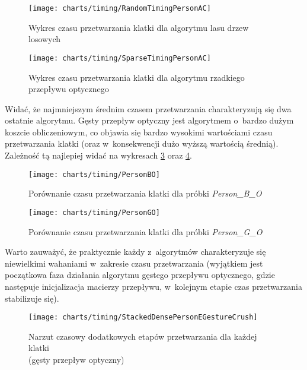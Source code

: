     \newpage
    \begin{figure}[!ht]
      \centering
      \texttt{[image: charts/timing/RandomTimingPersonAC]}
      \caption[Wykres czasu przetwarzania klatki dla algorytmu lasu drzew losowych]
              {Wykres czasu przetwarzania klatki dla algorytmu lasu drzew losowych}
      \label{fig:RandomTimingPersonAC}
    \end{figure}

    \begin{figure}[!ht]
      \centering
      \texttt{[image: charts/timing/SparseTimingPersonAC]}
      \caption[Wykres czasu przetwarzania klatki dla algorytmu rzadkiego przepływu optycznego]
              {Wykres czasu przetwarzania klatki dla algorytmu rzadkiego przepływu optycznego}
      \label{fig:SparseTimingPersonAC}
    \end{figure}

    Widać, że najmniejszym średnim czasem przetwarzania charakteryzują się dwa ostatnie algorytmu. Gęsty przepływ optyczny jest algorytmem o~bardzo dużym koszcie obliczeniowym, co objawia się bardzo wysokimi wartościami czasu przetwarzania klatki (oraz w~konsekwencji dużo wyższą wartością średnią). Zależność tą najlepiej widać na wykresach \ref{fig:PersonBO} oraz \ref{fig:PersonGO}.

    \begin{figure}[!ht]
      \centering
      \texttt{[image: charts/timing/PersonBO]}
      \caption[Porównanie czasu przetwarzania klatki dla próbki Person\_B\_O]
              {Porównanie czasu przetwarzania klatki dla próbki \textit{Person\_B\_O}}
      \label{fig:PersonBO}
    \end{figure}

    \begin{figure}[!ht]
      \centering
      \texttt{[image: charts/timing/PersonGO]}
      \caption[Porównanie czasu przetwarzania klatki dla próbki Person\_G\_O]
              {Porównanie czasu przetwarzania klatki dla próbki \textit{Person\_G\_O}}
      \label{fig:PersonGO}
    \end{figure}

    Warto zauważyć, że praktycznie każdy z~algorytmów charakteryzuje się niewielkimi wahaniami w~zakresie czasu przetwarzania (wyjątkiem jest początkowa faza działania algorytmu gęstego przepływu optycznego, gdzie następuje inicjalizacja macierzy przepływu, w~kolejnym etapie czas przetwarzania stabilizuje się).

    \begin{figure}[!ht]
      \centering
      \texttt{[image: charts/timing/StackedDensePersonEGestureCrush]}
      \caption[Narzut czasowy dodatkowych etapów przetwarzania dla każdej klatki\\(gęsty przepływ optyczny)]
              {Narzut czasowy dodatkowych etapów przetwarzania dla każdej klatki\\(gęsty przepływ optyczny)}
      \label{fig:StackedDense}
    \end{figure}

